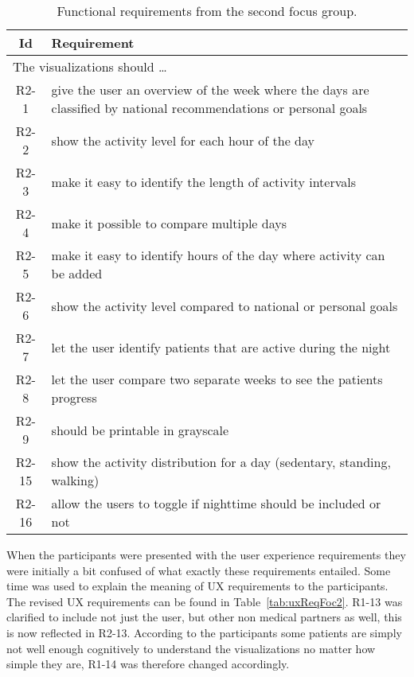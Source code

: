 \begin{table}[h!]
  \begin{center}
  \begin{tabular}{|c|p{12cm}|}
    \hline
      \textbf{Id} & \textbf{Requirement} \\ \hline
    \multicolumn{2}{|l|}{The visualizations should \ldots} \\ \hline
      R2-1 & give the user an overview of the week where the days are classified by national recommendations or personal goals \\ \hline
      R2-2 & show the activity level for each hour of the day \\ \hline
      R2-3 & make it easy to identify the length of activity intervals \\ \hline
      R2-4 & make it possible to compare multiple days \\ \hline
      R2-5 & make it easy to identify hours of the day where activity can be added \\ \hline
      R2-6 & show the activity level compared to national or personal goals \\ \hline
      R2-7 & let the user identify patients that are active during the night \\ \hline
      R2-8 & let the user compare two separate weeks to see the patients progress \\ \hline
      R2-9 & should be printable in grayscale \\ \hline
      R2-15 & show the activity distribution for a day (sedentary, standing, walking) \\ \hline
      R2-16 & allow the users to toggle if nighttime should be included or not \\ \hline
  \end{tabular}
  \end{center}
  \caption{Functional requirements from the second focus group.}
  \label{tab:reqFoc2}
\end{table}

When the participants were presented with the user experience requirements they were initially a bit confused of what exactly these requirements entailed. Some time was used to explain the meaning of UX requirements to the participants. The revised UX requirements can be found in Table~\ref{tab:uxReqFoc2}. R1-13 was clarified to include not just the user, but other non medical partners as well, this is now reflected in R2-13. According to the participants some patients are simply not well enough cognitively to understand the visualizations no matter how simple they are, R1-14 was therefore changed accordingly.

